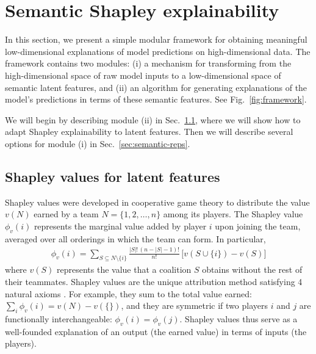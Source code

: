 \documentclass{article}
\DeclareRobustCommand{\Sec}[1]{Sec.~\ref{sec:#1}}
\DeclareRobustCommand{\Fig}[1]{Fig.~\ref{fig:#1}}
\newcommand{\eqn}[1]{\begin{align}#1\end{align}}
\begin{document}
\section{Semantic Shapley explainability}
\label{sec:semantic-shapley}


In this section, we present a simple modular framework for obtaining meaningful low-dimensional explanations of model predictions on high-dimensional data. The framework contains two modules: (i) a mechanism for transforming from the high-dimensional space of raw model inputs to a low-dimensional space of semantic latent features, and (ii) an algorithm for generating explanations of the model's predictions in terms of these semantic features. See \Fig{framework}.

We will begin by describing module (ii) in \Sec{shapley}, where we will show how to adapt Shapley  explainability to latent features. Then we will describe several options for module (i) in \Sec{semantic-reps}.


\subsection{Shapley values for latent features}
\label{sec:shapley}


Shapley values \citep{shapley52} were developed in cooperative game theory to distribute the value $v(N)$ earned by a team $N = \{1, 2, \ldots, n\}$ among its players. The Shapley value $\phi_v(i)$ represents the marginal value added by player $i$ upon joining the team, averaged over all orderings in which the team can form. In particular,
\eqn{
\label{eq:shapley}
\phi_v(i) = \sum_{S \subseteq N \setminus \{i\}}
\frac{|S|! \, (n-|S|-1)!}{n!} \,
\big[ v(S \cup \{i\}) - v(S) \big]
}
where $v(S)$ represents the value that a coalition $S$ obtains without the rest of their teammates. Shapley values are the unique attribution method satisfying 4 natural axioms \citep{shapley52}. For example, they sum to the total value earned: $\sum_i \phi_v(i) = v(N) - v(\{\})$, and they are symmetric if two players $i$ and $j$ are functionally interchangeable: $\phi_v(i) = \phi_v(j)$. Shapley values thus serve as a well-founded explanation of an output (the earned value) in terms of inputs (the players).
\end{document}
